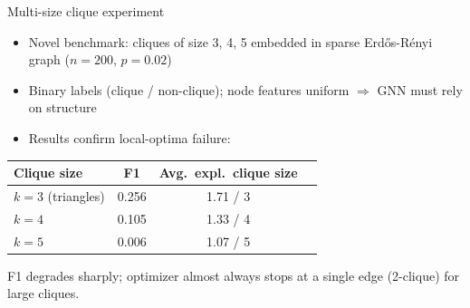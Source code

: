 \documentclass[xcolor=svgnames,aspectratio=169]{beamer}
\begin{document}
\begin{frame}{Multi-size clique experiment}
    \begin{itemize}
        \item Novel benchmark: cliques of size 3, 4, 5 embedded in sparse Erd\H{o}s-R\'enyi graph ($n=200$, $p=0.02$)
        \item Binary labels (clique / non-clique); node features uniform $\Rightarrow$ GNN must rely on structure
        \item Results confirm local-optima failure:
    \end{itemize}
    \begin{center}
    \begin{tabular}{lccc}
        \toprule
        Clique size & F1 & Avg.\ expl.\ clique size \\
        \midrule
        $k=3$ (triangles) & 0.256 & 1.71 / 3 \\
        $k=4$             & 0.105 & 1.33 / 4 \\
        $k=5$             & 0.006 & 1.07 / 5 \\
        \bottomrule
    \end{tabular}
    \end{center}
    \vspace{4pt}
    \small F1 degrades sharply; optimizer almost always stops at a single edge (2-clique) for large cliques.
\end{frame}


\end{document}
